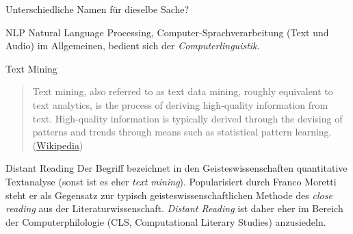 \begin{frame}{Unterschiedliche Namen für dieselbe Sache?}
\begin{block}{NLP}
Natural Language Processing, Computer-Sprachverarbeitung (Text und Audio) im Allgemeinen, bedient sich der \emph{Computerlinguistik}.
\end{block}

\begin{block}{Text Mining}
\begin{quote}
    Text mining, also referred to as text data mining, roughly equivalent to text analytics, is the process of deriving high-quality information from text. High-quality information is typically derived through the devising of patterns and trends through means such as statistical pattern learning. (\href{https://en.wikipedia.org/wiki/Text_mining}{Wikipedia})
\end{quote}
\end{block}

\begin{block}{Distant Reading}\footnotesize
Der Begriff bezeichnet in den Geisteswissenschaften quantitative Textanalyse (sonst ist es eher \emph{text mining}). Popularisiert durch Franco Moretti steht er als Gegensatz zur typisch geisteswissenschaftlichen Methode des \emph{close reading} aus der Literaturwissenschaft. \emph{Distant Reading} ist daher eher im Bereich der Computerphilologie (CLS, Computational Literary Studies) anzusiedeln.
\end{block}
\end{frame}





